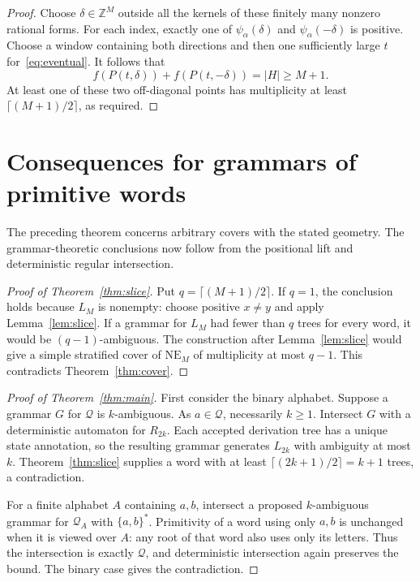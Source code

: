 \documentclass[a4paper,USenglish,cleveref,autoref]{lipics-v2021}
\newcommand{\Z}{\mathbb Z}
\newcommand{\Q}{\mathcal Q}
\newcommand{\NE}{\mathrm{NE}}
\begin{document}
\begin{proof}
Choose $\delta\in\Z^M$ outside all the kernels of these finitely many nonzero rational forms.
For each index, exactly one of $\psi_\alpha(\delta)$ and $\psi_\alpha(-\delta)$ is positive.
Choose a window containing both directions and then one sufficiently large $t$ for~\eqref{eq:eventual}.
It follows that
\[
 f(P(t,\delta))+f(P(t,-\delta))=|H|\geq M+1.
\]
At least one of these two off-diagonal points has multiplicity at least $\lceil(M+1)/2\rceil$, as required.
\end{proof}

\section{Consequences for grammars of primitive words}
The preceding theorem concerns arbitrary covers with the stated geometry.
The grammar-theoretic conclusions now follow from the positional lift and deterministic regular intersection.

\begin{proof}[Proof of Theorem~\ref{thm:slice}]
Put $q=\lceil(M+1)/2\rceil$.
If $q=1$, the conclusion holds because $L_M$ is nonempty: choose positive $x\ne y$ and apply Lemma~\ref{lem:slice}.
If a grammar for $L_M$ had fewer than $q$ trees for every word, it would be $(q-1)$-ambiguous.
The construction after Lemma~\ref{lem:slice} would give a simple stratified cover of $\NE_M$ of multiplicity at most $q-1$.
This contradicts Theorem~\ref{thm:cover}.
\end{proof}

\begin{proof}[Proof of Theorem~\ref{thm:main}]
First consider the binary alphabet.
Suppose a grammar $G$ for $\Q$ is $k$-ambiguous.
As $a\in\Q$, necessarily $k\geq1$.
Intersect $G$ with a deterministic automaton for $R_{2k}$.
Each accepted derivation tree has a unique state annotation, so the resulting grammar generates $L_{2k}$ with ambiguity at most $k$.
Theorem~\ref{thm:slice} supplies a word with at least $\lceil(2k+1)/2\rceil=k+1$ trees, a contradiction.

For a finite alphabet $A$ containing $a,b$, intersect a proposed $k$-ambiguous grammar for $\Q_A$ with $\{a,b\}^*$.
Primitivity of a word using only $a,b$ is unchanged when it is viewed over $A$: any root of that word also uses only its letters.
Thus the intersection is exactly $\Q$, and deterministic intersection again preserves the bound.
The binary case gives the contradiction.
\end{proof}
\end{document}
